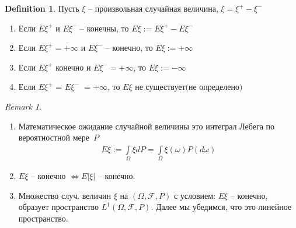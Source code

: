 \documentclass[a4paper]{article}
\theoremstyle{plain}
\theoremstyle{remark}
\newtheorem*{remark}{Remark}
\theoremstyle{definition}
\newtheorem{definition}{Definition}
\newcommand{\setF}{\mathcal{F}}
\begin{document}
\begin{definition}
  Пусть $\xi$ -- произвольная случайная величина, $\xi = \xi^+ - \xi^-$

  \begin{enumerate}
    \item 
      Если $E \xi^+$ и $E \xi^-$ -- конечны, то 
      $\boxed{E\xi := E \xi^+ - E \xi^-}$

    \item 
      Если $E \xi^+ = +\infty$ и $E \xi^-$ -- конечно, то $\boxed{E\xi := +\infty}$

    \item
      Если $E \xi^+$ конечно и $E \xi^- = +\infty$, то $\boxed{E\xi := -\infty}$

    \item 
      Если $E \xi^+$ = $E \xi^-$ $= +\infty$, то $E \xi \text{ не существует(не определено)}$

  \end{enumerate}
\end{definition}
\begin{remark}~
  \begin{enumerate}
    \item
      Математическое ожидание случайной величины это интеграл Лебега по вероятностной мере~$P$
      \begin{align*}
        E\xi := \int\limits_{\Omega} \xi dP = \int\limits_{\Omega} \xi(\omega) P(d\omega)
      \end{align*}

    \item
      $E\xi$ -- конечно $\iff E|\xi|$ -- конечно.

    \item
      Множество случ. величин $\xi$ на $(\Omega, \setF, P)$ с условием: $E\xi$ -- конечно, образует
      пространство $L^1(\Omega, \setF, P)$. Далее мы убедимся, что это линейное пространство.

  \end{enumerate}
\end{remark}
\end{document}
